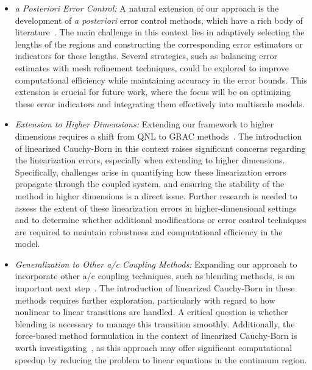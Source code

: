 \begin{itemize}
    \item {\it a Posteriori Error Control:} A natural extension of our approach is the development of \textit{a posteriori} error control methods, which have a rich body of literature~\cite{1996_RV_A_Post_Adapt,2014_CO_HW_A_Post_ACC_IMANUM, 2023_YW_HW_Efficient_Adaptivity_AC_JSC,2021_YW_HC_ML_CO_HW_LZ_A_Post_QMMM_SISC}. The main challenge in this context lies in adaptively selecting the lengths of the regions and constructing the corresponding error estimators or indicators for these lengths. Several strategies, such as balancing error estimates with mesh refinement techniques, could be explored to improve computational efficiency while maintaining accuracy in the error bounds. This extension is crucial for future work, where the focus will be on optimizing these error indicators and integrating them effectively into multiscale models.
    
	\item {\it Extension to Higher Dimensions:} Extending our framework to higher dimensions requires a shift from QNL to GRAC methods~\cite{2012_CO_LZ_GRAC_Construction_SIAMNUM,2014_CO_LZ_GRAC_Coeff_Optim_CMAME}. The introduction of linearized Cauchy-Born in this context raises significant concerns regarding the linearization errors, especially when extending to higher dimensions. Specifically, challenges arise in quantifying how these linearization errors propagate through the coupled system, and ensuring the stability of the method in higher dimensions is a direct issue. Further research is needed to assess the extent of these linearization errors in higher-dimensional settings and to determine whether additional modifications or error control techniques are required to maintain robustness and computational efficiency in the model.

	
	\item {\it Generalization to Other a/c Coupling Methods:} Expanding our approach to incorporate other a/c coupling techniques, such as blending methods, is an important next step~\cite{2008_SB_MP_PB_MG_AC_Blending_MMS,2011_BK_ML_BQCE_1D_SIMNUM,2016_XL_CO_AS_BK_BQC_Anal_2D_NUMMATH, wang2023adaptive}. The introduction of linearized Cauchy-Born in these methods requires further exploration, particularly with regard to how nonlinear to linear transitions are handled. A critical question is whether blending is necessary to manage this transition smoothly. Additionally, the force-based method formulation in the context of linearized Cauchy-Born is worth investigating~\cite{2008_MD_ML_Ana_Force_Based_QC_M2NA,2019_HW_SL_FY_A_Post_QCF_1D_NMTMA}, as this approach may offer significant computational speedup by reducing the problem to linear equations in the continuum region.
	

\end{itemize}
